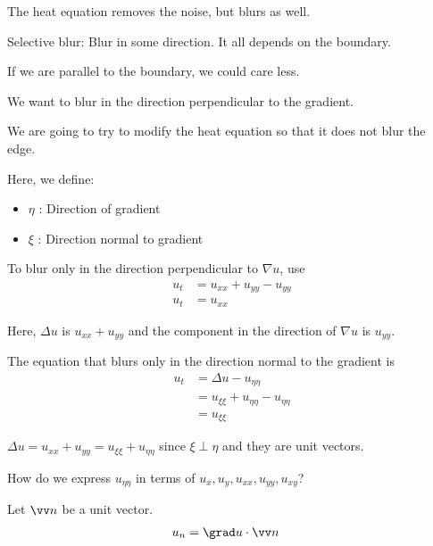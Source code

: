 The heat equation removes the noise, but blurs as well.


Selective blur: Blur in some direction. It all depends on the boundary.

If we are parallel to the boundary, we could care less.

We want to blur in the direction perpendicular to the gradient.



We are going to try to modify the heat equation so that it does not blur the edge.


Here, we define:

\begin{itemize}
  \item $\eta$ : Direction of gradient
  \item $\xi$ : Direction normal to gradient
\end{itemize}

To blur only in the direction perpendicular to $\nabla u$, use
%
\begin{align}
  u_t & = u_{xx} + u_{yy} - u_{yy}\\
  u_t & = u_{xx}
\end{align}

Here, $\Delta u$ is $u_{xx} + u_{yy}$ and the component in the direction of $\nabla u$ is $u_{yy}$.

The equation that blurs only in the direction normal to the gradient is
%
\begin{align}
  u_t & = \Delta u - u_{\eta \eta}\\
  & = u_{\xi \xi} + u_{\eta \eta} - u_{\eta \eta}\\
  & = u_{\xi \xi}
\end{align}

\note $\Delta u = u_{xx} + u_{yy} = u_{\xi \xi} + u_{\eta \eta}$ since $\xi \perp \eta$ and they are unit vectors.

How do we express $u_{\eta\eta}$ in terms of $u_x, u_y, u_{xx}, u_{yy}, u_{xy}$?

Let $\vv n$ be a unit vector.
%
\begin{align}
  u_n & = \grad u \cdot \vv n
\end{align}

